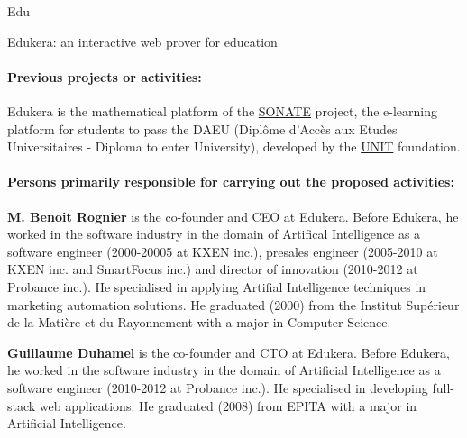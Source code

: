 \begin{sitedescription}{Edu}
\begin{compactitem}
    \item Edukera: an interactive web prover for education
\end{compactitem}

\paragraph*{Previous projects or activities:}

\begin{compactitem}
\item Edukera is the mathematical platform of the \hyperlink{https://daeu-sonate.fr/}{SONATE} project, the e-learning platform for
students to pass the DAEU (Diplôme d'Accès aux Etudes Universitaires - Diploma to enter University), developed by the \hyperlink{http://www.unit.eu/}{UNIT} foundation.
\end{compactitem}


\paragraph*{Persons primarily responsible for carrying out the proposed activities:}

\begin{compactitem} %
\item{\bf M. Benoit Rognier} is the co-founder and CEO at Edukera.
Before Edukera, he worked in the software industry in the domain of Artifical Intelligence
as a software engineer (2000-20005 at KXEN inc.), presales engineer (2005-2010 at KXEN inc.
and SmartFocus inc.) and director of innovation (2010-2012 at Probance inc.).
He specialised in applying Artifial Intelligence techniques in marketing automation solutions.
He graduated (2000) from the Institut Supérieur de la Matière et du Rayonnement
with a major in Computer Science.

\item{\bf Guillaume Duhamel} is the co-founder and CTO at Edukera.
Before Edukera, he worked in the software industry in the domain of Artificial Intelligence
as a software engineer (2010-2012 at Probance inc.). He specialised in developing full-stack web applications.
He graduated (2008) from EPITA with a major in Artificial Intelligence.
\end{compactitem}

\end{sitedescription}

